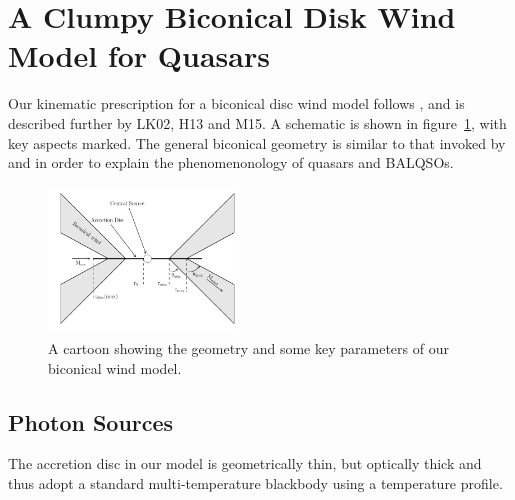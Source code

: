 \documentclass[useAMS,usenatbib]{mn2e_x}
\begin{document}




\section{A Clumpy Biconical Disk Wind Model for Quasars}

Our kinematic prescription for a biconical disc wind model
follows \cite{SV93}, and is described further by
LK02, H13 and M15. A schematic is shown in figure~\ref{fig:cartoon},
with key aspects marked. The general biconical
geometry is similar to that invoked by \cite{MCGV95} and 
\cite{elvis2000} in order to explain the phenomenonology
of quasars and BALQSOs.


\begin{figure} 
\centering
\includegraphics[width=0.45\textwidth]{figures/fig2_cartoon.png}
\caption
{
A cartoon showing the geometry and some key parameters of
our biconical wind model.
}
\label{fig:cartoon}
\end{figure} 





\subsection{Photon Sources}


The accretion disc in our model is geometrically thin, but optically thick
and thus adopt a standard multi-temperature blackbody
using a \cite{shakurasunyaev1973} temperature profile. 
\end{document}

